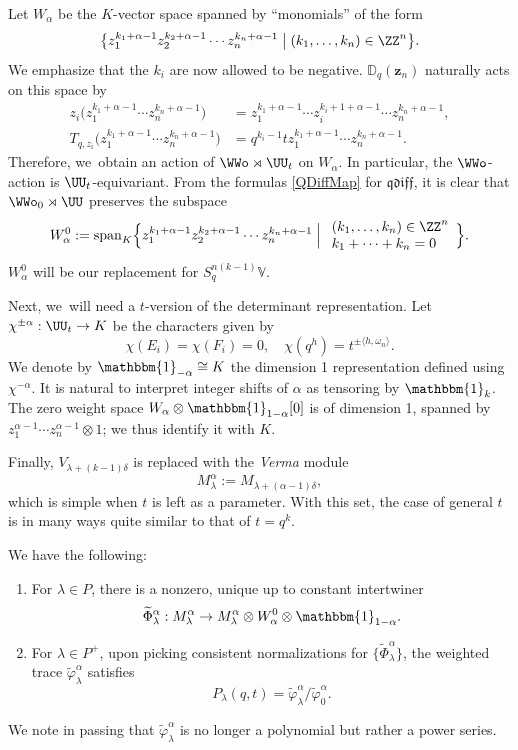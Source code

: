 Let $W_\alpha$ be the $K$-vector space spanned by ``monomials'' of the form
\[
\bigl\{z_1^{k_1+\alpha-1}z_2^{k_2+\alpha-1}\cdots z_n^{k_n+\alpha-1}\bigm| (k_1,\ldots, k_n)\in\ZZ^n \bigr\}.
\]
We emphasize that the $k_i$ are now allowed to be negative.
$\mathbb{D}_q(\boldsymbol{z}_n)$ naturally acts on this space by
\begin{align*}
z_i\bigl(z_1^{k_1+\alpha-1}\cdots z_n^{k_n+\alpha-1}\bigr)&= z_1^{k_1+\alpha-1}\cdots z_i^{k_i+1+\alpha-1}\cdots z_n^{k_n+\alpha-1},\\
T_{q,z_i} \bigl(z_1^{k_1+\alpha-1}\cdots z_n^{k_n+\alpha-1}\bigr)&= q^{k_i-1}tz_1^{k_1+\alpha-1}\cdots z_n^{k_n+\alpha-1}.
\end{align*}
Therefore, we~obtain an action of $\WWo\rtimes\UU_t$ on $W_\alpha$.
In particular, the $\WWo$-action is $\UU_t$-equivariant.
From the formulas \eqref{QDiffMap} for $\mathfrak{qdiff}$, it is clear that $\WWo_0\rtimes\UU$ preserves the subspace
\[
W^0_\alpha:=
\mathrm{span}_{K}\Bigl\{z_1^{k_1+\alpha-1}z_2^{k_2+\alpha-1}\cdots z_n^{k_n+\alpha-1}\Bigm|
\begin{array}{l}
(k_1,\ldots, k_n)\in\ZZ^n \\
k_1+\cdots +k_n=0
\end{array}
\Bigr\}.
\]
$W^0_\alpha$ will be our replacement for $S_q^{n(k-1)}\mathbb{V}$.

Next, we~will need a $t$-version of the determinant representation.
Let $\chi^{\pm\alpha}:\UU_t\to K$ be the characters given by
\begin{equation*}
\chi(E_i)=\chi(F_i)=0,\quad
\chi(q^{h})=t^{\pm\langle h,\omega_n\rangle}.
\end{equation*}
We denote by $\mathbbm{1}_{-\alpha}\cong K$ the dimension 1 representation defined using $\chi^{-\alpha}$.
It is natural to interpret integer shifts of $\alpha$ as tensoring by $\mathbbm{1}_k$.
The zero weight space $W_\alpha\otimes\mathbbm{1}_{1-\alpha}[0]$ is of dimension 1, spanned by $z_1^{\alpha-1}\cdots z_n^{\alpha-1}\otimes 1$; we thus identify it with $K$.

Finally, $V_{\lambda+(k-1)\delta}$ is replaced with the \textit{Verma} module
\[
M_\lambda^\alpha:=M_{\lambda+(\alpha-1)\delta},
\]
which is simple when $t$ is left as a parameter.
With this set, the case of general $t$ is in many ways quite similar to that of $t=q^k$.
\begin{thm}
We have the following:
\begin{enumerate}
\item For $\lambda\in P$, there is a nonzero, unique up to constant intertwiner
\[
\widetilde{\Phi}_\lambda^\alpha: M_{\lambda}^{\alpha}\to M_{\lambda}^{\alpha}\otimes W^0_{\alpha}\otimes\mathbbm{1}_{1-\alpha}.
\]
\item For $\lambda\in P^+$, upon picking consistent normalizations for $\{ \widetilde{\Phi}_\lambda^\alpha \}$, the weighted trace $\widetilde{\varphi}^\alpha_{\lambda}$ satisfies
\[
P_\lambda(q,t)=\widetilde{\varphi}_{\lambda}^\alpha\big/\widetilde{\varphi}_{0}^\alpha.
\]
\end{enumerate}
\end{thm}
We note in passing that $\widetilde{\varphi}_{\lambda}^\alpha$ is no longer a polynomial but rather a power series.

